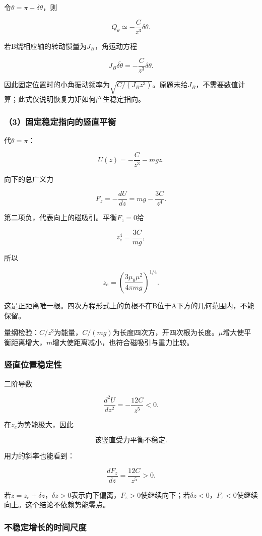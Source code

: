 \documentclass[12pt,a4paper,fontset=fandol]{ctexart}
\begin{document}
令\(\theta=\pi+\delta\theta\)，则

\[
Q_\theta\simeq-\frac C{z^3}\delta\theta.
\]

若B绕相应轴的转动惯量为\(J_B\)，角运动方程

\[
J_B\delta\ddot\theta=-\frac C{z^3}\delta\theta.
\]

因此固定位置时的小角振动频率为\(\sqrt{C/(J_Bz^3)}\)。原题未给\(J_B\)，不需要数值计算；此式仅说明恢复力矩如何产生稳定指向。

\subsubsection{（3）固定稳定指向的竖直平衡}\label{ux56faux5b9aux7a33ux5b9aux6307ux5411ux7684ux7ad6ux76f4ux5e73ux8861}

代\(\theta=\pi\)：

\[
U(z)=-\frac C{z^3}-mgz.
\]

向下的总广义力

\[
F_z=-\frac{dU}{dz}
=mg-\frac{3C}{z^4}.
\]

第二项负，代表向上的磁吸引。平衡\(F_z=0\)给

\[
z_e^4=\frac{3C}{mg},
\]

所以

\[
\boxed{z_e=\left(\frac{3\mu_0\mu^2}{4\pi mg}\right)^{1/4}}.
\]

这是正距离唯一根。四次方程形式上的负根不在B位于A下方的几何范围内，不能保留。

量纲检验：\(C/z^3\)为能量，\(C/(mg)\)为长度四次方，开四次根为长度。\(\mu\)增大使平衡距离增大，\(m\)增大使距离减小，也符合磁吸引与重力比较。

\subsubsection{竖直位置稳定性}\label{ux7ad6ux76f4ux4f4dux7f6eux7a33ux5b9aux6027}

二阶导数

\[
\frac{d^2U}{dz^2}=-\frac{12C}{z^5}<0.
\]

在\(z_e\)为势能极大，因此

\[
\boxed{\text{该竖直受力平衡不稳定}}.
\]

用力的斜率也能看到：

\[
\frac{dF_z}{dz}=\frac{12C}{z^5}>0.
\]

若\(z=z_e+\delta z\)，\(\delta z>0\)表示向下偏离，\(F_z>0\)使继续向下；若\(\delta z<0\)，\(F_z<0\)使继续向上。这个结论不依赖势能零点。

\subsubsection{不稳定增长的时间尺度}\label{ux4e0dux7a33ux5b9aux589eux957fux7684ux65f6ux95f4ux5c3aux5ea6}
\end{document}
